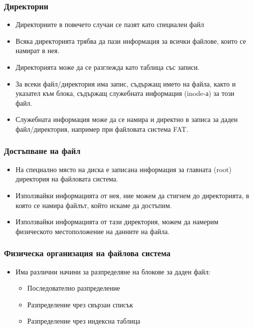 \documentclass[ignorenonframetext, hyperref=unicode]{beamer}
\begin{document}
\begin{frame}
\frametitle{Директории}
\begin{itemize}
  \item Директориите в повечето случаи се пазят като специален файл
  \item Всяка директорията трябва да пази информация за всички файлове, които се намират в нея.
  \item Директорията може да се разглежда като таблица със записи.
  \item За всеки файл/директория има запис, съдържащ името на файла, както и указател към блока, съдържащ служебната информация (inode-а) за този файл.
  \item Служебната информация може да се намира и директно в записа за даден файл/директория, например при файловата система FAT.
\end{itemize}
\end{frame}

\begin{frame}
\frametitle{Достъпване на файл}
\begin{itemize}
  \item На специално място на диска е записана информация за главната (root) директория на файловата система.
  \item Използвайки информацията от нея, ние можем да стигнем до директорията, в която се намира файлът, който искаме да достъпим.
  \item Използвайки информацията от тази директория, можем да намерим физическото местоположение на данните на файла.

\end{itemize}
\end{frame}



\begin{frame}
\frametitle{Физическа организация на файлова система}
\begin{itemize}
  \item Има различни начини за разпределяне на блокове за даден файл:
  \begin{itemize}
	\item Последователно разпределение
	\item Разпределение чрез свързан списък
	\item Разпределение чрез индексна таблица
  \end{itemize}
\end{itemize}
\end{frame}
\end{document}
